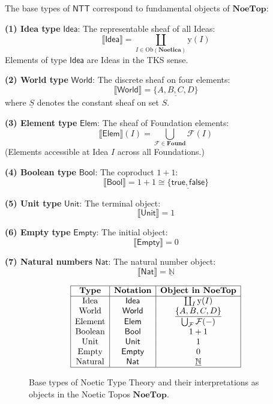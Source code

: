 \begin{definition}
\label{def:noetic-base-types}
The base types of $\mathsf{NTT}$ correspond to fundamental objects of $\mathbf{NoeTop}$:

\textbf{(1) Idea type} $\mathsf{Idea}$: The representable sheaf of all Ideas:
\[
  \llbracket \mathsf{Idea} \rrbracket = \coprod_{I \in \mathrm{Ob}(\mathbf{Noetica})} \mathrm{y}(I)
\]
Elements of type $\mathsf{Idea}$ are Ideas in the TKS sense.

\textbf{(2) World type} $\mathsf{World}$: The discrete sheaf on four elements:
\[
  \llbracket \mathsf{World} \rrbracket = \underline{\{A, B, C, D\}}
\]
where $\underline{S}$ denotes the constant sheaf on set $S$.

\textbf{(3) Element type} $\mathsf{Elem}$: The sheaf of Foundation elements:
\[
  \llbracket \mathsf{Elem} \rrbracket(I) = \bigcup_{\mathcal{F} \in \mathbf{Found}} \mathcal{F}(I)
\]
(Elements accessible at Idea $I$ across all Foundations.)

\textbf{(4) Boolean type} $\mathsf{Bool}$: The coproduct $1 + 1$:
\[
  \llbracket \mathsf{Bool} \rrbracket = 1 + 1 \cong \underline{\{\mathsf{true}, \mathsf{false}\}}
\]

\textbf{(5) Unit type} $\mathsf{Unit}$: The terminal object:
\[
  \llbracket \mathsf{Unit} \rrbracket = 1
\]

\textbf{(6) Empty type} $\mathsf{Empty}$: The initial object:
\[
  \llbracket \mathsf{Empty} \rrbracket = 0
\]

\textbf{(7) Natural numbers} $\mathsf{Nat}$: The natural number object:
\[
  \llbracket \mathsf{Nat} \rrbracket = \underline{\mathbb{N}}
\]
\end{definition}

\begin{figure}[ht]
\centering
\[
\begin{array}{|c|c|c|}
\hline
\textbf{Type} & \textbf{Notation} & \textbf{Object in } \mathbf{NoeTop} \\
\hline
\text{Idea} & \mathsf{Idea} & \coprod_I \mathrm{y}(I) \\
\text{World} & \mathsf{World} & \underline{\{A,B,C,D\}} \\
\text{Element} & \mathsf{Elem} & \bigcup_{\mathcal{F}} \mathcal{F}(-) \\
\text{Boolean} & \mathsf{Bool} & 1 + 1 \\
\text{Unit} & \mathsf{Unit} & 1 \\
\text{Empty} & \mathsf{Empty} & 0 \\
\text{Natural} & \mathsf{Nat} & \underline{\mathbb{N}} \\
\hline
\end{array}
\]
\caption{Base types of Noetic Type Theory and their interpretations as objects
in the Noetic Topos $\mathbf{NoeTop}$.}
\label{fig:base-types}
\end{figure}

